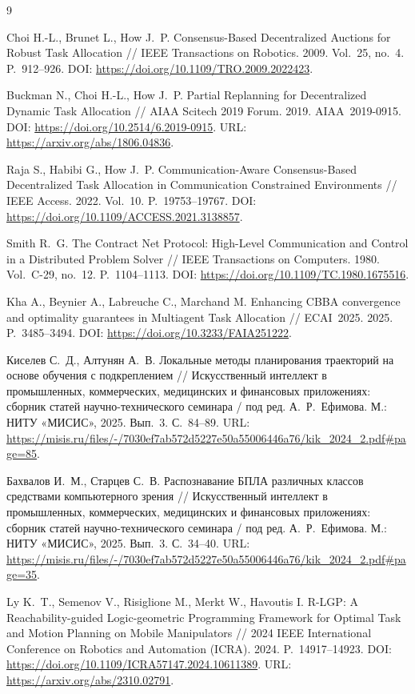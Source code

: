 \documentclass{misisarticle}
\begin{document}
\balance
\begin{thebibliography}{9}

Choi H.-L., Brunet L., How J.~P. Consensus-Based Decentralized Auctions for Robust Task Allocation // IEEE Transactions on Robotics. 2009. Vol.~25, no.~4. P.~912--926. DOI: \url{https://doi.org/10.1109/TRO.2009.2022423}.

Buckman N., Choi H.-L., How J.~P. Partial Replanning for Decentralized Dynamic Task Allocation // AIAA Scitech 2019 Forum. 2019. AIAA~2019-0915. DOI: \url{https://doi.org/10.2514/6.2019-0915}. URL: \url{https://arxiv.org/abs/1806.04836}.

Raja S., Habibi G., How J.~P. Communication-Aware Consensus-Based Decentralized Task Allocation in Communication Constrained Environments // IEEE Access. 2022. Vol.~10. P.~19753--19767. DOI: \url{https://doi.org/10.1109/ACCESS.2021.3138857}.

Smith R.~G. The Contract Net Protocol: High-Level Communication and Control in a Distributed Problem Solver // IEEE Transactions on Computers. 1980. Vol.~C-29, no.~12. P.~1104--1113. DOI: \url{https://doi.org/10.1109/TC.1980.1675516}.

Kha A., Beynier A., Labreuche C., Marchand M. Enhancing CBBA convergence and optimality guarantees in Multiagent Task Allocation // ECAI~2025. 2025. P.~3485--3494. DOI: \url{https://doi.org/10.3233/FAIA251222}.

Киселев С.~Д., Алтунян А.~В. Локальные методы планирования траекторий на основе обучения с подкреплением // Искусственный интеллект в промышленных, коммерческих, медицинских и финансовых приложениях: сборник статей научно-технического семинара / под ред. А.~Р.~Ефимова. М.: НИТУ «МИСИС», 2025. Вып.~3. С.~84--89. URL: \url{https://misis.ru/files/-/7030ef7ab572d5227e50a55006446a76/kik_2024_2.pdf#page=85}.

Бахвалов И.~М., Старцев С.~В. Распознавание БПЛА различных классов средствами компьютерного зрения // Искусственный интеллект в промышленных, коммерческих, медицинских и финансовых приложениях: сборник статей научно-технического семинара / под ред. А.~Р.~Ефимова. М.: НИТУ «МИСИС», 2025. Вып.~3. С.~34--40. URL: \url{https://misis.ru/files/-/7030ef7ab572d5227e50a55006446a76/kik_2024_2.pdf#page=35}.

Ly K.~T., Semenov V., Risiglione M., Merkt W., Havoutis I. R-LGP: A Reachability-guided Logic-geometric Programming Framework for Optimal Task and Motion Planning on Mobile Manipulators // 2024 IEEE International Conference on Robotics and Automation (ICRA). 2024. P.~14917--14923. DOI: \url{https://doi.org/10.1109/ICRA57147.2024.10611389}. URL: \url{https://arxiv.org/abs/2310.02791}.

\end{thebibliography}
\end{document}

